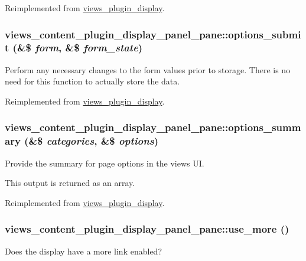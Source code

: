 Reimplemented from \hyperlink{classviews__plugin__display_ad9c69d91ea1165ff51dcd1f1f6d3a154}{views\_\-plugin\_\-display}.\hypertarget{classviews__content__plugin__display__panel__pane_a5ee46f64275ee0fe1865b98f1b7811bf}{
\subsubsection[{options\_\-submit}]{\setlength{\rightskip}{0pt plus 5cm}views\_\-content\_\-plugin\_\-display\_\-panel\_\-pane::options\_\-submit (\&\$ {\em form}, \/  \&\$ {\em form\_\-state})}}
\label{classviews__content__plugin__display__panel__pane_a5ee46f64275ee0fe1865b98f1b7811bf}
Perform any necessary changes to the form values prior to storage. There is no need for this function to actually store the data. 

Reimplemented from \hyperlink{classviews__plugin__display_a75f0b2d5587b365640fcb4d414daae36}{views\_\-plugin\_\-display}.\hypertarget{classviews__content__plugin__display__panel__pane_aa93bc6c55f47c07f6d36695bea916b43}{
\subsubsection[{options\_\-summary}]{\setlength{\rightskip}{0pt plus 5cm}views\_\-content\_\-plugin\_\-display\_\-panel\_\-pane::options\_\-summary (\&\$ {\em categories}, \/  \&\$ {\em options})}}
\label{classviews__content__plugin__display__panel__pane_aa93bc6c55f47c07f6d36695bea916b43}
Provide the summary for page options in the views UI.

This output is returned as an array. 

Reimplemented from \hyperlink{classviews__plugin__display_a7a2f2aeedfc14816815e3ce65a61aedf}{views\_\-plugin\_\-display}.\hypertarget{classviews__content__plugin__display__panel__pane_a4d0a60ad1d64917b0e90495bd7fe5f30}{
\subsubsection[{use\_\-more}]{\setlength{\rightskip}{0pt plus 5cm}views\_\-content\_\-plugin\_\-display\_\-panel\_\-pane::use\_\-more ()}}
\label{classviews__content__plugin__display__panel__pane_a4d0a60ad1d64917b0e90495bd7fe5f30}
Does the display have a more link enabled? 

